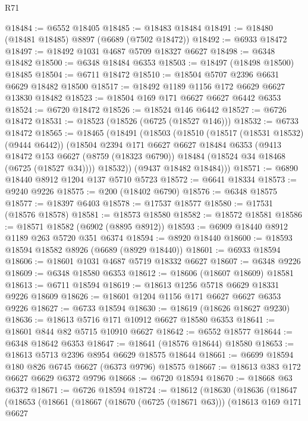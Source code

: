\begin{lexlean}{R71}
\begin{coremodule}
@18484 := @6552 @18405
@18485 := @18483 @18484
@18491 := @18480 (@18481 @18485) @8897 (@6689 (@7502 @18472))
@18492 := @6933 @18472
@18497 := @18492 @1031 @4687 @5709 @18327 @6627
@18498 := @6348 @18482
@18500 := @6348 @18484 @6353
@18503 := @18497 (@18498 @18500) @18485
@18504 := @6711 @18472
@18510 := @18504 @5707 @2396 @6631 @6629 @18482 @18500
@18517 := @18492 @1189 @1156 @172 @6629 @6627 @13830 @18482
@18523 := @18504 @169 @171 @6627 @6627 @6442 @6353
@18524 := @6720 @18472
@18526 := @18524 @146 @6442
@18527 := @6726 @18472
@18531 := @18523 (@18526 (@6725 (@18527 @146)))
@18532 := @6733 @18472
@18565 := @18465
    (@18491
      (@18503
        (@18510
          (@18517 (@18531 @18532) (@9444 @6442))
          (@18504
            @2394
            @171
            @6627
            @6627
            @18484
            @6353
            (@9413
              @18472
              @153
              @6627
              (@8759 (@18323 @6790))
              @18484
              (@18524 @34 @18468 (@6725 (@18527 @34))))
            @18532))
        (@9437 @18482 @18484)))
@18571 := @6890 @18440 @8912 @1204 @137 @5710 @5723
@18572 := @6641 @18334
@18573 := @9240 @9226
@18575 := @200 (@18402 @6790)
@18576 := @6348 @18575
@18577 := @18397 @6403
@18578 := @17537 @18577
@18580 := @17531 (@18576 @18578)
@18581 := @18573 @18580
@18582 := @18572 @18581
@18586 := @18571 @18582 (@6902 (@8895 @8912))
@18593 := @6909 @18440 @8912 @1189 @263 @5720 @351 @6374
@18594 := @8920 @18440
@18600 := @18593 @18594 @18582 @8926 (@6689 (@8929 @18440))
@18601 := @6933 @18594
@18606 := @18601 @1031 @4687 @5719 @18332 @6627
@18607 := @6348 @9226
@18609 := @6348 @18580 @6353
@18612 := @18606 (@18607 @18609) @18581
@18613 := @6711 @18594
@18619 := @18613 @1256 @5718 @6629 @18331 @9226 @18609
@18626 := @18601 @1204 @1156 @171 @6627 @6627 @6353 @9226
@18627 := @6733 @18594
@18630 := @18619 (@18626 @18627 @9230)
@18636 := @18613 @5716 @171 @10912 @6627 @18580 @6353
@18641 := @18601 @844 @82 @5715 @10910 @6627
@18642 := @6552 @18577
@18644 := @6348 @18642 @6353
@18647 := @18641 (@18576 @18644) @18580
@18653 := @18613 @5713 @2396 @8954 @6629 @18575 @18644
@18661 := @6699 @18594 @180 @826 @6745 @6627 (@6373 @9796) @18575
@18667 := @18613 @383 @172 @6627 @6629 @6372 @9796
@18668 := @6720 @18594
@18670 := @18668 @63 @6372
@18671 := @6726 @18594
@18724 := @18612
    (@18630
      (@18636
        (@18647
          (@18653
            (@18661
              (@18667
                (@18670 (@6725 (@18671 @63)))
                (@18613
                  @169
                  @171
                  @6627

\end{coremodule}
\end{lexlean}
